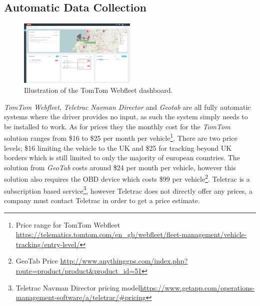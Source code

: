 \subsection{Automatic Data Collection}%
\begin{figure}[h!]
    \centering
    \includegraphics[width=0.5\textwidth]{img/tomtom_webfleet.jpeg}
    \caption{Illustration of the TomTom Webfleet dashboard.}
    \label{fig:TomTom_Webfleet}
\end{figure}
\textit{TomTom Webfleet}, \textit{Teletrac Navman Director} and \textit{Geotab} are all fully automatic systems where the driver provides no input, as such the system simply needs to be installed to work.
As for prices they the monthly cost for the \textit{TomTom} solution ranges from \$16 to \$25 per month per vehicle\footnote{Price range for TomTom Webfleet\\ \url{https://telematics.tomtom.com/en_gb/webfleet/fleet-management/vehicle-tracking/entry-level/}}.
There are two price levels; \$16 limiting the vehicle to the UK and \$25 for tracking beyond UK borders which is still limited to only the majority of european countries.
The solution from \textit{GeoTab} costs around \$24 per month per vehicle, however this solution also requires the OBD device which costs \$99 per vehicle\footnote{GeoTab Price \url{http://www.anythinggps.com/index.php?route=product/product\&product_id=51}}.
Teletrac is a subscription based service\footnote{Teletrac Navman Director pricing model\url{https://www.getapp.com/operations-management-software/a/teletrac/\#pricing}}, however Teletrac does not directly offer any prices, a company must contact Teletrac in order to get a price estimate.

